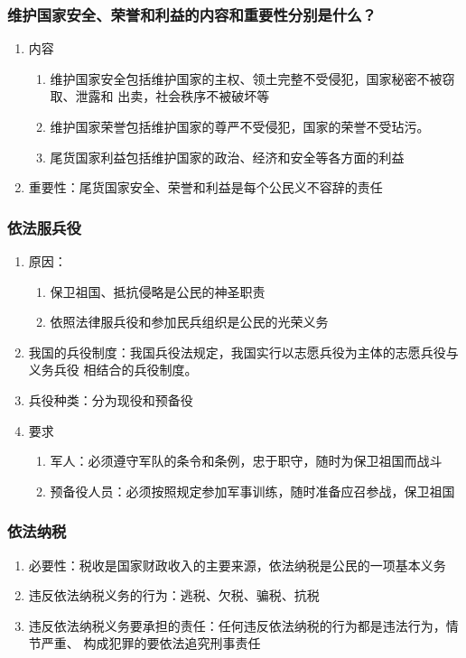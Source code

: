 \documentclass[11pt]{article}
\begin{document}
\subsubsection{维护国家安全、荣誉和利益的内容和重要性分别是什么？}
\label{sec:org16be49b}
\begin{enumerate}
\item 内容
\begin{enumerate}
\item 维护国家安全包括维护国家的主权、领土完整不受侵犯，国家秘密不被窃取、泄露和
出卖，社会秩序不被破坏等
\item 维护国家荣誉包括维护国家的尊严不受侵犯，国家的荣誉不受玷污。
\item 尾货国家利益包括维护国家的政治、经济和安全等各方面的利益
\end{enumerate}
\item 重要性：尾货国家安全、荣誉和利益是每个公民义不容辞的责任
\end{enumerate}
\subsubsection{依法服兵役}
\label{sec:org4562f4d}
\begin{enumerate}
\item 原因：
\begin{enumerate}
\item 保卫祖国、抵抗侵略是公民的神圣职责
\item 依照法律服兵役和参加民兵组织是公民的光荣义务
\end{enumerate}
\item 我国的兵役制度：我国兵役法规定，我国实行以志愿兵役为主体的志愿兵役与义务兵役
相结合的兵役制度。
\item 兵役种类：分为现役和预备役
\item 要求
\begin{enumerate}
\item 军人：必须遵守军队的条令和条例，忠于职守，随时为保卫祖国而战斗
\item 预备役人员：必须按照规定参加军事训练，随时准备应召参战，保卫祖国
\end{enumerate}
\end{enumerate}
\subsubsection{依法纳税}
\label{sec:orgb69420f}
\begin{enumerate}
\item 必要性：税收是国家财政收入的主要来源，依法纳税是公民的一项基本义务
\item 违反依法纳税义务的行为：逃税、欠税、骗税、抗税
\item 违反依法纳税义务要承担的责任：任何违反依法纳税的行为都是违法行为，情节严重、
构成犯罪的要依法追究刑事责任
\end{enumerate}
\end{document}
